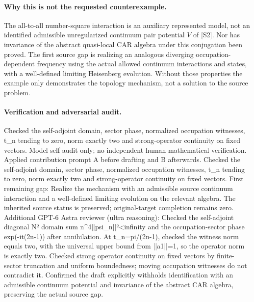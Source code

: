 \documentclass[11pt]{article}
\begin{document}
\paragraph{Why this is not the requested counterexample.} The all-to-all number-square interaction is an auxiliary represented model, not an identified admissible unregularized continuum pair potential \(V\) of [S2]. Nor has invariance of the abstract quasi-local CAR algebra under this conjugation been proved. The first source gap is realizing an analogous diverging occupation-dependent frequency using the actual allowed continuum interactions and states, with a well-defined limiting Heisenberg evolution. Without those properties the example only demonstrates the topology mechanism, not a solution to the source problem.

\paragraph{Verification and adversarial audit.}
Checked the self-adjoint domain, sector phase, normalized occupation witnesses, t\_n tending to zero, norm exactly two and strong-operator continuity on fixed vectors. Model self-audit only; no independent human mathematical verification. Applied contribution prompt A before drafting and B afterwards. Checked the self-adjoint domain, sector phase, normalized occupation witnesses, t\_n tending to zero, norm exactly two and strong-operator continuity on fixed vectors. First remaining gap: Realize the mechanism with an admissible source continuum interaction and a well-defined limiting evolution on the relevant algebra. The inherited source status is preserved; original-target completion remains zero. Additional GPT-6 Astra reviewer (ultra reasoning): Checked the self-adjoint diagonal N² domain sum n\textasciicircum{}4||psi\_n||²<infinity and the occupation-sector phase exp(-it(2n-1)) after annihilation. At t\_n=pi/(2n-1), checked the witness norm equals two, with the universal upper bound from ||a1||=1, so the operator norm is exactly two. Checked strong operator continuity on fixed vectors by finite-sector truncation and uniform boundedness; moving occupation witnesses do not contradict it. Confirmed the draft explicitly withholds identification with an admissible continuum potential and invariance of the abstract CAR algebra, preserving the actual source gap.
\end{document}
